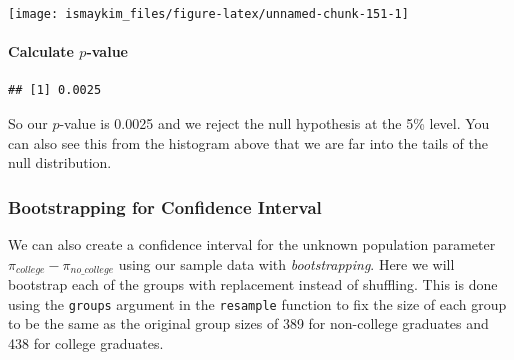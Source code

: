 \documentclass[]{tufte-book}
\newenvironment{Shaded}{\begin{snugshade}}{\end{snugshade}}
\newcommand{\KeywordTok}[1]{\textcolor[rgb]{0.13,0.29,0.53}{\textbf{{#1}}}}
\newcommand{\DataTypeTok}[1]{\textcolor[rgb]{0.13,0.29,0.53}{{#1}}}
\newcommand{\DecValTok}[1]{\textcolor[rgb]{0.00,0.00,0.81}{{#1}}}
\newcommand{\StringTok}[1]{\textcolor[rgb]{0.31,0.60,0.02}{{#1}}}
\newcommand{\OtherTok}[1]{\textcolor[rgb]{0.56,0.35,0.01}{{#1}}}
\newcommand{\NormalTok}[1]{{#1}}
\begin{document}
\begin{center}\texttt{[image: ismaykim\_files/figure-latex/unnamed-chunk-151-1]} \end{center}

\paragraph{\texorpdfstring{Calculate
\(p\)-value}{Calculate p-value}}\label{calculate-p-value-2}

\begin{Shaded}
\end{Shaded}

\begin{verbatim}
## [1] 0.0025
\end{verbatim}

So our \(p\)-value is 0.0025 and we reject the null hypothesis at the
5\% level. You can also see this from the histogram above that we are
far into the tails of the null distribution.

\subsubsection{Bootstrapping for Confidence
Interval}\label{bootstrapping-for-confidence-interval-2}

We can also create a confidence interval for the unknown population
parameter \(\pi_{college} - \pi_{no\_college}\) using our sample data
with \emph{bootstrapping}. Here we will bootstrap each of the groups
with replacement instead of shuffling. This is done using the
\texttt{groups} argument in the \texttt{resample} function to fix the
size of each group to be the same as the original group sizes of 389 for
non-college graduates and 438 for college graduates.

\begin{Shaded}
\end{Shaded}
\end{document}
